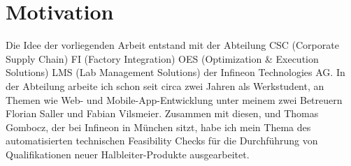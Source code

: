 \section{Motivation}
Die Idee der vorliegenden Arbeit entstand mit der Abteilung CSC (Corporate Supply Chain) FI (Factory Integration) OES (Optimization \& Execution Solutions) LMS (Lab Management Solutions) der Infineon Technologies AG. 
In der Abteilung arbeite ich schon seit circa zwei Jahren als Werkstudent, an Themen wie Web- und Mobile-App-Entwicklung unter meinem zwei Betreuern Florian Saller und Fabian Vilsmeier.
Zusammen mit diesen, und Thomas Gombocz, der bei Infineon in München sitzt, habe ich mein Thema des automatisierten technischen Feasibility Checks für die Durchführung von Qualifikationen neuer Halbleiter-Produkte ausgearbeitet.